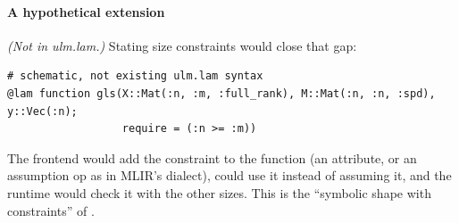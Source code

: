 \paragraph{A hypothetical extension} \emph{(Not in ulm.lam.)} Stating size
constraints would close that gap:
\begin{lstlisting}[style=jl]
# schematic, not existing ulm.lam syntax
@lam function gls(X::Mat(:n, :m, :full_rank), M::Mat(:n, :n, :spd), y::Vec(:n);
                  require = (:n >= :m))
\end{lstlisting}
The frontend would add the constraint to the function (an attribute, or an
assumption op as in MLIR's  dialect),  could
use it instead of assuming it, and the runtime would check it with the other
sizes. This is the ``symbolic shape with constraints'' of .
